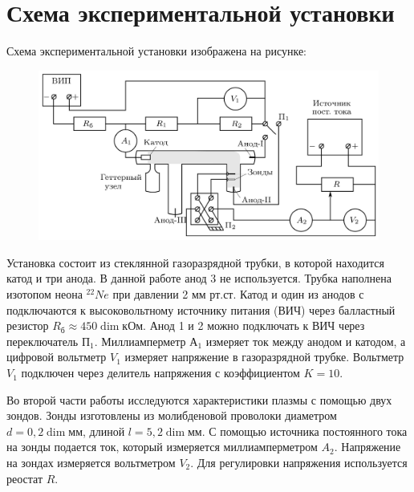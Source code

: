 \section*{Схема экспериментальной установки}

Схема экспериментальной установки изображена на рисунке:

\begin{figure}[H]
	\centering
	\includegraphics[width=1\textwidth]{../res/exp scheme.png}
\end{figure}

Установка состоит из стеклянной газоразрядной трубки, в которой находится катод и три анода. В данной работе анод 3 не используется. Трубка наполнена изотопом неона $^{22}Ne$ при давлении 2 мм рт.ст. Катод и один из анодов с подключаются к высоковольтному источнику питания (ВИЧ) через балластный резистор $R_б \approx 450 \dim кОм$. Анод 1 и 2 можно подключать к ВИЧ через переключатель $П_1$. Миллиамперметр $А_1$ измеряет ток между анодом и катодом, а цифровой вольтметр $V_1$ измеряет напряжение в газоразрядной трубке. Вольтметр $V_1$ подключен через делитель напряжения с коэффициентом $K = 10$. 

Во второй части работы исследуются характеристики плазмы с помощью двух зондов. Зонды изготовлены из молибденовой проволоки диаметром $d = 0,2 \dim мм$, длиной $l = 5,2 \dim мм$. С помощью источника постоянного тока на зонды подается ток, который измеряется миллиамперметром $A_2$. Напряжение на зондах измеряется вольтметром $V_2$. Для регулировки напряжения используется реостат $R$.

